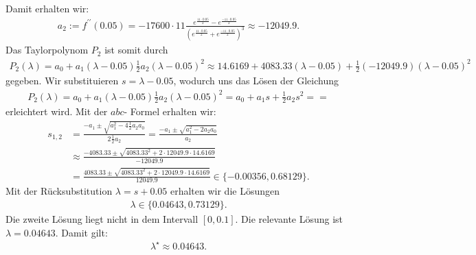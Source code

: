 Damit erhalten wir:
\begin{align*}
	a_2
	:=
	f^{\prime \prime}(0.05)
	=
	-17600 \cdot 11 
	\frac{e^{\frac{11 \cdot 0.05}{2}} 
		-  e^{\frac{-11 \cdot 0.05}{2}}
	}{
		\left( e^{\frac{11 \cdot 0.05}{2}} + e^{\frac{-11 \cdot 0.05}{2}} \right)^3
	}
	\approx 
	-12049.9.
\end{align*}
Das Taylorpolynom $P_2$ ist somit durch 
\begin{align*}
	P_2(\lambda)
	= 
	a_0 
	+ 
	a_1(\lambda - 0.05)
	\frac{1}{2}
	a_2 
	(\lambda - 0.05)^2 	
	\approx
	14.6169
	+
	4083.33
	(\lambda - 0.05)
	+
	\frac{1}{2}
	(-12049.9) (\lambda - 0.05)^2
\end{align*}
gegeben.
Wir substituieren $s = \lambda - 0.05$, wodurch uns das Lösen der Gleichung
\begin{align*}
	P_2(\lambda) = a_0 
	+ 
	a_1(\lambda - 0.05)
	\frac{1}{2}
	a_2 
	(\lambda - 0.05)^2 	
	=
	a_0 + a_1 s +\frac{1}{2} a_2 s^2 = =
\end{align*}
erleichtert wird. Mit der $abc$- Formel erhalten wir:
\begin{align*}
	s_{1,2}
	&=
	\frac{-a_1 \pm \sqrt{a_1^2 - 4 \frac{1}{2} a_2 a_0}}{2 \frac{1}{2} a_2}
	=
	\frac{-a_1 \pm \sqrt{a_1^2 - 2  a_2 a_0}}{ a_2} \\
	&\approx
	\frac{-4083.33 \pm \sqrt{4083.33^2 + 2 \cdot 12049.9 \cdot 14.6169}}{-12049.9}\\
	&=
	\frac{4083.33 \pm \sqrt{4083.33^2 + 2 \cdot 12049.9 \cdot 14.6169}}{12049.9}
	\in 
	\{ -0.00356, 0.68129\}.
\end{align*}
Mit der Rücksubstitution $\lambda = s + 0.05$ erhalten wir die Lösungen 
\begin{align*}
	\lambda
	\in 
	\{
	0.04643,0.73129
	\}.
\end{align*}
Die zweite Lösung liegt nicht in dem Intervall $[0,0.1]$. Die relevante Lösung ist $\lambda = 0.04643$. Damit gilt:
\begin{align*}
	\lambda^\star
	\approx
	0.04643.
\end{align*}
\newpage
